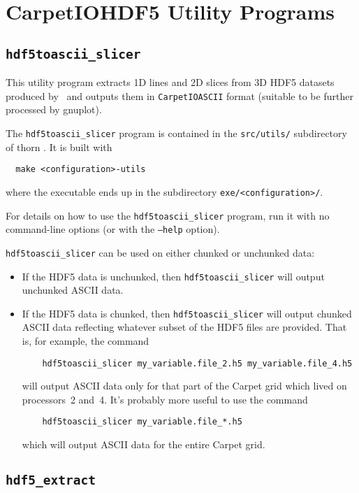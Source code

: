 \documentclass{article}
\begin{document}
\section{CarpetIOHDF5 Utility Programs}

\subsection{{\tt hdf5toascii\_slicer}}

This utility program extracts 1D lines and 2D slices from 3D HDF5
datasets produced by \ThisThorn\ and outputs them in {\tt CarpetIOASCII} format
(suitable to be further processed by gnuplot).

The {\tt hdf5toascii\_slicer} program is contained in the {\tt src/utils/}
subdirectory of thorn \ThisThorn. It is built with
\begin{verbatim}
  make <configuration>-utils
\end{verbatim}
where the executable ends up in the subdirectory {\tt exe/<configuration>/}.

For details on how to use the {\tt hdf5toascii\_slicer} program,
run it with no command-line options (or with the {\tt --help} option).

{\tt hdf5toascii\_slicer} can be used on either chunked or unchunked
data:
\begin{itemize}
\item	If the HDF5 data is unchunked, then {\tt hdf5toascii\_slicer}
	will output unchunked ASCII data.
\item	If the HDF5 data is chunked, then {\tt hdf5toascii\_slicer}
	will output chunked ASCII data reflecting whatever subset of
	the HDF5 files are provided.  That is, for example, the command
	\begin{verbatim}
	hdf5toascii_slicer my_variable.file_2.h5 my_variable.file_4.h5
	\end{verbatim}
	will output ASCII data only for that part of the Carpet grid
	which lived on processors~2 and~4.  It's probably more useful
	to use the command
	\begin{verbatim}
	hdf5toascii_slicer my_variable.file_*.h5
	\end{verbatim}
	which will output ASCII data for the entire Carpet grid.
\end{itemize}


\subsection{{\tt hdf5\_extract}}
\end{document}
